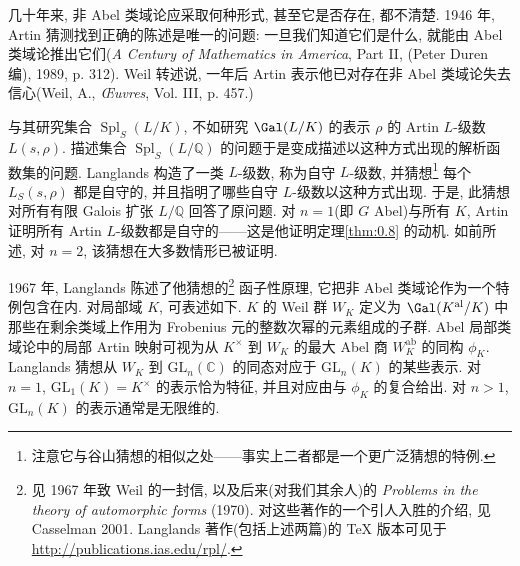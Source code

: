 几十年来, 非 Abel 类域论应采取何种形式, 甚至它是否存在, 都不清楚. 1946 年, Artin 猜测找到正确的陈述是唯一的问题: 一旦我们知道它们是什么, 就能由 Abel 类域论推出它们(\emph{A Century of Mathematics in America}, Part II, (Peter Duren 编), 1989, p. 312). Weil 转述说, 一年后 Artin 表示他已对存在非 Abel 类域论失去信心(Weil, A., \emph{Œuvres}, Vol. III, p. 457.)

与其研究集合 $\operatorname{Spl}_{S}(L/K)$, 不如研究 $\Gal(L/K)$ 的表示 $\rho$ 的 Artin $L$-级数 $L(s, \rho)$. 描述集合 $\operatorname{Spl}_{S}(L/\mathbb{Q})$ 的问题于是变成描述以这种方式出现的解析函数集的问题. Langlands 构造了一类 $L$-级数, 称为自守 $L$-级数, 并猜想\footnote{注意它与谷山猜想的相似之处——事实上二者都是一个更广泛猜想的特例.} 每个 $L_{S}(s, \rho)$ 都是自守的, 并且指明了哪些自守 $L$-级数以这种方式出现. 于是, 此猜想对所有有限 Galois 扩张 $L/\mathbb{Q}$ 回答了原问题. 对 $n = 1$(即 $G$ Abel)与所有 $K$, Artin 证明所有 Artin $L$-级数都是自守的——这是他证明定理\ref{thm:0.8} 的动机. 如前所述, 对 $n = 2$, 该猜想在大多数情形已被证明.

1967 年, Langlands 陈述了他猜想的\footnote{见 1967 年致 Weil 的一封信, 以及后来(对我们其余人)的 \emph{Problems in the theory of automorphic forms} (1970). 对这些著作的一个引人入胜的介绍, 见 Casselman 2001\cite{Casselman2001}. Langlands 著作(包括上述两篇)的 TeX 版本可见于 \url{http://publications.ias.edu/rpl/}.} 函子性原理, 它把非 Abel 类域论作为一个特例包含在内. 对局部域 $K$, 可表述如下. $K$ 的 Weil 群 $W_{K}$ 定义为 $\Gal(K^{\mathrm{al}}/K)$ 中那些在剩余类域上作用为 Frobenius 元的整数次幂的元素组成的子群. Abel 局部类域论中的局部 Artin 映射可视为从 $K^{\times}$ 到 $W_{K}$ 的最大 Abel 商 $W_{K}^{\mathrm{ab}}$ 的同构 $\phi_{K}$. Langlands 猜想从 $W_{K}$ 到 $\mathrm{GL}_{n}(\mathbb{C})$ 的同态对应于 $\mathrm{GL}_{n}(K)$ 的某些表示. 对 $n = 1$, $\mathrm{GL}_{1}(K) = K^{\times}$ 的表示恰为特征, 并且对应由与 $\phi_{K}$ 的复合给出. 对 $n > 1$, $\mathrm{GL}_{n}(K)$ 的表示通常是无限维的.

